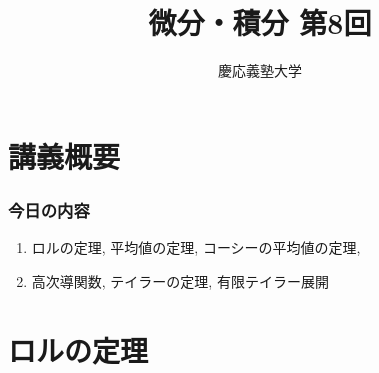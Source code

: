 \documentclass[dvipdfmx,cjk,10.2pt]{beamer}
\theoremstyle{definition}
\begin{document}
\title{微分・積分 第8回} 
\author{慶応義塾大学}            %
\date{}



\begin{frame}                  %
\titlepage                     %
\end{frame}








\section{講義概要}


\begin{frame}
\frametitle{今日の内容}



\begin{enumerate}
\item ロルの定理, 平均値の定理, コーシーの平均値の定理, 
\item 高次導関数, テイラーの定理, 有限テイラー展開
\end{enumerate} 



\end{frame}









\section{ロルの定理}
\end{document}
